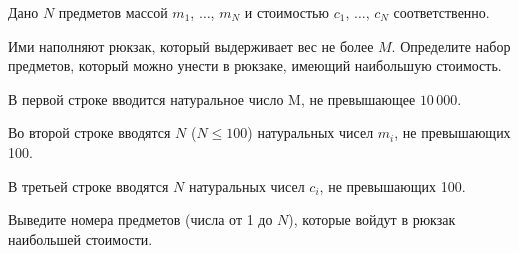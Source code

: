 Дано $N$ предметов массой $m_1$, $\dots$, $m_N$ и стоимостью $c_1$, $\dots$, $c_N$ 
соответственно.

Ими наполняют рюкзак, который выдерживает вес не более $M$. 
Определите набор предметов, который можно унести в рюкзаке, имеющий наибольшую стоимость.

\InputFile
В первой строке вводится натуральное число M, не превышающее $10\,000$.

Во второй строке вводятся $N$ ($N \le 100$) натуральных чисел $m_i$, не превышающих 100.

В третьей строке вводятся $N$ натуральных чисел $c_i$, не превышающих 100.

\OutputFile
Выведите номера предметов (числа от 1 до $N$), 
которые войдут в рюкзак наибольшей стоимости.

